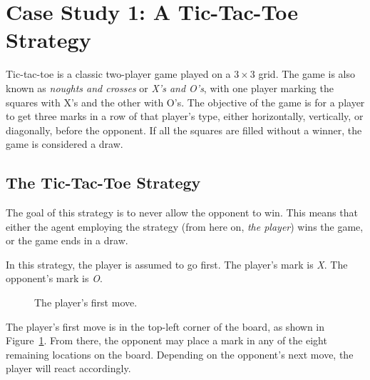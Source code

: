
\section{Case Study 1: A Tic-Tac-Toe Strategy}\label{sec:tic-tac-toe}

Tic-tac-toe is a classic two-player game played on a $3 \times 3$ grid.
The game is also known as \textit{noughts and crosses} or \textit{X's and O's},
with one player marking the squares with X's and the other with O's.
The objective of the game is for a player to get three marks in a row of that
player's type, either horizontally, vertically, or diagonally, before the
opponent.
If all the squares are filled without a winner, the game is considered a draw.

\subsection{The Tic-Tac-Toe Strategy}\label{subsec:the-tic-tac-toe-strategy}

The goal of this strategy is to never allow the opponent to win.
This means that either the agent employing the strategy
(from here on, \textit{the player}) wins the game, or the game ends in a draw.

In this strategy, the player is assumed to go first.
The player's mark is \textit{X}.
The opponent's mark is \textit{O}.

\begin{figure}
    \begin{center}
        \tictactoeboard{+}{ }{ }{ }{ }{ }{ }{ }{ }
    \end{center}
    \caption{The player's first move.}
    \label{fig:ttt-move-1}
\end{figure}

The player's first move is in the top-left corner of the board,
as shown in Figure~\ref{fig:ttt-move-1}.
From there, the opponent may place a mark in any of the eight remaining
locations on the board.
Depending on the opponent's next move, the player will react accordingly.

